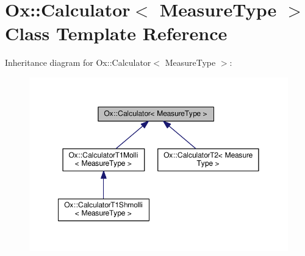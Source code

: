 \hypertarget{class_ox_1_1_calculator}{\section{Ox\-:\-:Calculator$<$ Measure\-Type $>$ Class Template Reference}
\label{class_ox_1_1_calculator}
}


Inheritance diagram for Ox\-:\-:Calculator$<$ Measure\-Type $>$\-:
\nopagebreak
\begin{figure}[H]
\begin{center}
\leavevmode
\includegraphics[width=350pt]{class_ox_1_1_calculator__inherit__graph}
\end{center}
\end{figure}
